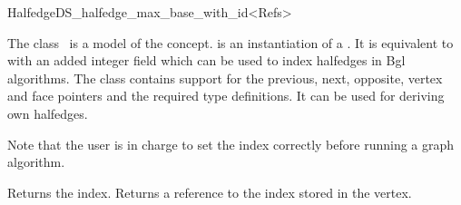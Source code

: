 
\ccRefPageBegin



\begin{ccRefClass}{HalfedgeDS_halfedge_max_base_with_id<Refs>}

\ccDefinition
  
The class \ccRefName\ is a model of the 
concept.  is an instantiation of a . 
It is equivalent to  with an added integer
field which can be used to index halfedges in {\sc Bgl} algorithms.
The class contains support for the previous, next, opposite, vertex and 
face pointers and the required type definitions.
It can be used for deriving own halfedges.

Note that the user is in charge to set the index correctly before
running a graph algorithm.


\ccIsModel


\ccCreation
{}


{Returns the index.}
\ccGlue
{}
{Returns a reference to the index stored in the vertex.}

\ccSeeAlso

\\
\\
\\
\\
\\
\\

\end{ccRefClass}

\ccRefPageEnd

